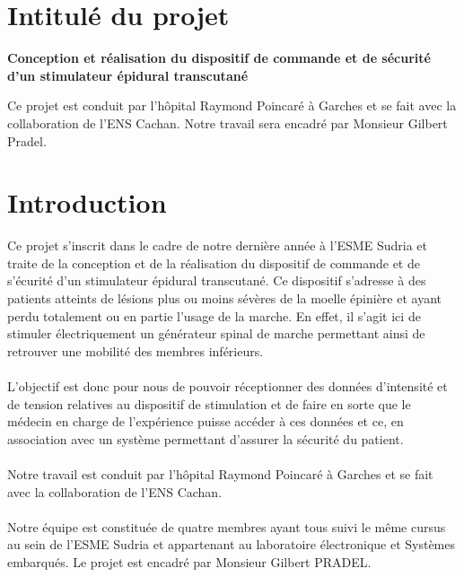 \documentclass{report}
\begin{document}
\newpage

\tableofcontents

\newpage


\chapter*{Intitul\'{e} du projet}
\begin{center}
\textbf{Conception et r\'{e}alisation du dispositif de commande et de s\'{e}curit\'{e} d'un stimulateur \'{e}pidural transcutan\'{e}}
\vspace*{1cm}
\end{center}
Ce projet est conduit par l'h\^{o}pital Raymond Poincar\'{e} \`{a} Garches et se fait avec la collaboration de l'ENS Cachan. Notre travail sera encadr\'{e} par Monsieur Gilbert Pradel.

\chapter*{Introduction}

Ce projet s’inscrit dans le cadre de notre derni\`{e}re ann\'{e}e \`{a} l’ESME Sudria et traite de la conception et de la r\'{e}alisation du 
dispositif de commande et de s'\'{e}curit\'{e} d'un stimulateur \'{e}pidural transcutan\'{e}. Ce dispositif s’adresse \`{a} des 
patients atteints de l\'{e}sions plus ou moins s\'{e}v\`{e}res de la moelle \'{e}pini\`{e}re et ayant perdu totalement ou en partie l’usage 
de la marche. En effet, il s’agit ici de stimuler \'{e}lectriquement un g\'{e}n\'{e}rateur spinal de marche permettant ainsi de
retrouver une mobilit\'{e} des membres inf\'{e}rieurs.\\\\
L’objectif est donc pour nous de pouvoir r\'{e}ceptionner des donn\'{e}es d’intensit\'{e} et de tension relatives au dispositif de stimulation et de faire en sorte que le m\'{e}decin en charge de l’exp\'{e}rience 
puisse acc\'{e}der \`{a} ces donn\'{e}es et ce, en association avec un syst\`{e}me permettant d’assurer la s\'{e}curit\'{e} du patient. \\ \\
Notre travail est conduit par l'h\^{o}pital Raymond Poincar\'{e} \`{a} Garches et se fait avec la collaboration de l'ENS Cachan.\\ \\
Notre \'{e}quipe est constitu\'{e}e de quatre membres ayant tous suivi le m\^{e}me cursus au sein de l’ESME Sudria et appartenant 
au laboratoire \'{e}lectronique et Syst\`{e}mes embarqu\'{e}s. Le projet est encadr\'{e} par Monsieur Gilbert PRADEL.
\end{document}
